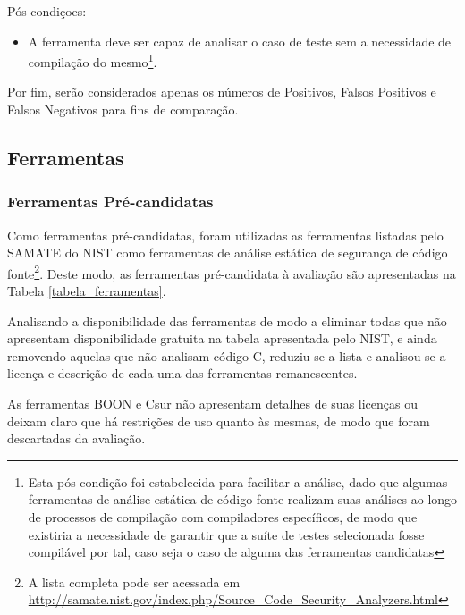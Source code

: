 Pós-condiçoes:
\begin{itemize}
  \item A ferramenta deve ser capaz de analisar o caso de teste sem a necessidade de compilação do mesmo\footnote{Esta pós-condição foi estabelecida para facilitar a análise, dado que algumas ferramentas de análise estática de código fonte realizam suas análises ao longo de processos de compilação com compiladores específicos, de modo que existiria a necessidade de garantir que a suíte de testes selecionada fosse compilável por tal, caso seja o caso de alguma das ferramentas candidatas}.
\end{itemize}

Por fim, serão considerados apenas os números de Positivos, Falsos Positivos e Falsos Negativos para fins de comparação.

\subsection{Ferramentas}

\subsubsection{Ferramentas Pré-candidatas}

Como ferramentas pré-candidatas, foram utilizadas as ferramentas listadas pelo SAMATE do NIST como ferramentas de análise estática de segurança de código fonte\footnote{A lista completa pode ser acessada em \url{http://samate.nist.gov/index.php/Source_Code_Security_Analyzers.html}}. Deste modo, as ferramentas pré-candidata à avaliação são apresentadas na Tabela \ref{tabela_ferramentas}.


Analisando a disponibilidade das ferramentas de modo a eliminar todas que não apresentam disponibilidade gratuita na tabela apresentada pelo NIST, e ainda removendo aquelas que não analisam código C, reduziu-se a lista e analisou-se a licença e descrição de cada uma das ferramentas remanescentes.

As ferramentas BOON e Csur não apresentam detalhes de suas licenças ou deixam claro que há restrições de uso quanto às mesmas, de modo que foram descartadas da avaliação.

